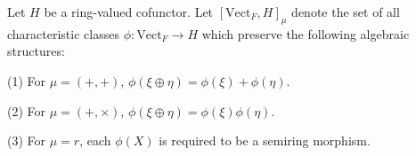Let $H$ be a ring-valued cofunctor. Let $[\text{Vect}_F, H]_\mu$ denote the set of all characteristic classes $\phi: \text{Vect}_F \rightarrow H$ which preserve the following algebraic structures:

(1) For $\mu = (+, +)$, $\phi(\xi \oplus \eta) = \phi(\xi) + \phi(\eta)$.

(2) For $\mu = (+, \times)$, $\phi(\xi \oplus \eta) = \phi(\xi)\phi(\eta)$.

(3) For $\mu = r$, each $\phi(X)$ is required to be a semiring morphism.
